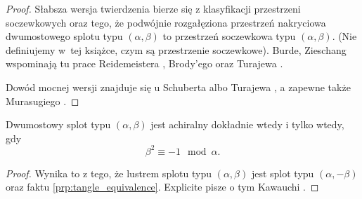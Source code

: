 \begin{proof}
    Słabsza wersja twierdzenia bierze się z klasyfikacji przestrzeni soczewkowych oraz tego, że podwójnie rozgałęziona przestrzeń nakryciowa dwumostowego splotu typu $(\alpha, \beta)$ to przestrzeń soczewkowa typu $(\alpha, \beta)$.
    (Nie definiujemy w~tej książce, czym są przestrzenie soczewkowe).
    Burde, Zieschang \cite[s. 212]{burde14} wspominają tu prace Reidemeistera \cite{reidemeisterXX}, Brody'ego \cite{brodyXX} oraz Turajewa \cite{turaevXX}.

    Dowód mocnej wersji znajduje się u Schuberta \cite{schubert56} albo Turajewa \cite{turaevXX}, a zapewne także Murasugiego \cite[s. ?]{murasugi96}.
\end{proof}

\begin{proposition}
    Dwumostowy splot typu $(\alpha, \beta)$ jest achiralny dokładnie wtedy i tylko wtedy, gdy
    \begin{equation}
        \beta^2 \equiv -1 \mod \alpha.
    \end{equation}
\end{proposition}

\begin{proof}
    Wynika to z tego, że lustrem splotu typu $(\alpha, \beta)$ jest splot typu $(\alpha, -\beta)$ oraz faktu \ref{prp:tangle_equivalence}.
    Explicite pisze o tym Kawauchi \cite[s. 24]{kawauchi96}.
\end{proof}

